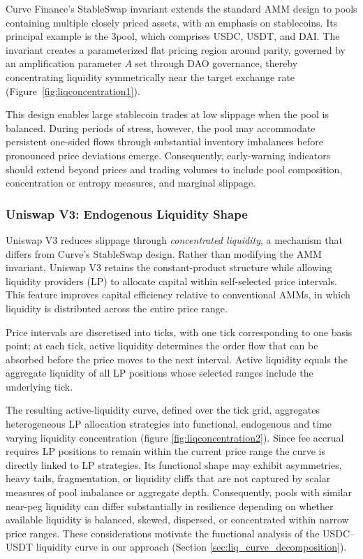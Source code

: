 \documentclass[a4paper,fleqn]{cas-sc}
\begin{document}
Curve Finance's StableSwap invariant extends the standard AMM design to pools containing multiple closely priced assets, with an emphasis on stablecoins. Its principal example is the 3pool, which comprises USDC, USDT, and DAI. The invariant creates a parameterized flat pricing region around parity, governed by an amplification parameter $A$ set through DAO governance, thereby concentrating liquidity symmetrically near the target exchange rate (Figure~\ref{fig:liqconcentration1}). 

This design enables large stablecoin trades at low slippage when the pool is balanced. During periods of stress, however, the pool may accommodate persistent one-sided flows through substantial inventory imbalances before pronounced price deviations emerge. Consequently, early-warning indicators should extend beyond prices and trading volumes to include pool composition, concentration or entropy measures, and marginal slippage.

\subsubsection{Uniswap V3: Endogenous Liquidity Shape}

Uniswap V3 reduces slippage through \emph{concentrated liquidity}, a mechanism that differs from Curve's StableSwap design. Rather than modifying the AMM invariant, Uniswap V3 retains the constant-product structure while allowing liquidity providers (LP) to allocate capital within self-selected price intervals. This feature improves capital efficiency relative to conventional AMMs, in which liquidity is distributed across the entire price range. 

Price intervals are discretised into ticks, with one tick corresponding to one basis point; at each tick, active liquidity determines the order flow that can be absorbed before the price moves to the next interval. Active liquidity equals the aggregate liquidity of all LP positions whose selected ranges include the underlying tick.

The resulting active-liquidity curve, defined over the tick grid, aggregates heterogeneous LP allocation strategies into functional, endogenous and time varying liquidity concentration (figure \ref{fig:liqconcentration2}). Since fee accrual requires LP positions to remain within the current price range the curve is directly linked to LP strategies. Its functional shape may exhibit asymmetries, heavy tails, fragmentation, or liquidity cliffs that are not captured by scalar measures of pool imbalance or aggregate depth. Consequently, pools with similar near-peg liquidity can differ substantially in resilience depending on whether available liquidity is balanced, skewed, dispersed, or concentrated within narrow price ranges. These considerations motivate the functional analysis of the USDC--USDT liquidity curve in our approach (Section \ref{sec:liq_curve_decomposition}).
\end{document}
